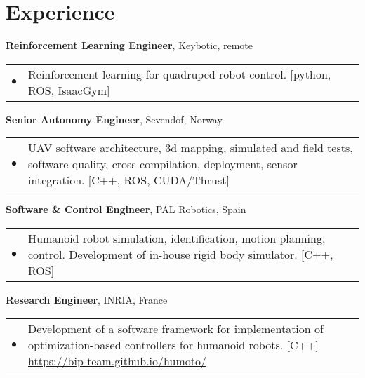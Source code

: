 \documentclass[a4paper,10pt]{report}
\begin{document}
\vspace{0.15cm}
\section{Experience}
\begin{adjustwidth}{0.5cm}{0pt}
    {\bf {} Reinforcement Learning Engineer}, Keybotic, remote\\
        \begin{tabularx}{\linewidth}{l X}
            \hfill $\bullet$    & Reinforcement learning for quadruped robot control. [python, ROS, IsaacGym]
        \end{tabularx}

    \vspace{0.15cm}

    {\bf {} Senior Autonomy Engineer}, Sevendof, Norway\\
        \begin{tabularx}{\linewidth}{l X}
            \hfill $\bullet$    & UAV software architecture, 3d mapping, simulated and field tests,
                                  software quality, cross-compilation, deployment, sensor integration.
                                  [C++, ROS, CUDA/Thrust]
        \end{tabularx}

    \vspace{0.15cm}

    {\bf {} Software \& Control Engineer}, PAL Robotics, Spain\\
        \begin{tabularx}{\linewidth}{l X}
            \hfill $\bullet$    & Humanoid robot simulation, identification, motion planning, control.
                                  Development of in-house rigid body simulator. [C++, ROS]
        \end{tabularx}

    \vspace{0.15cm}

    {\bf {} Research Engineer}, INRIA, France\\
        \begin{tabularx}{\linewidth}{l X}
            \hfill $\bullet$    & Development of a software framework for implementation
                                  of optimization-based controllers for humanoid robots.
                                  [C++]
                                  \href{https://bip-team.github.io/humoto/}{https://bip-team.github.io/humoto/}
        \end{tabularx}


\end{adjustwidth}
\end{document}
